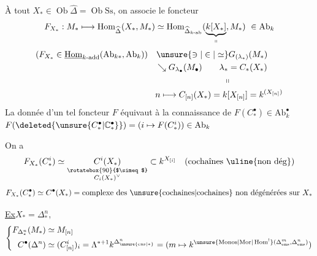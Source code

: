 À tout $X_*\in\operatorname{Ob}\widehat\Delta=\operatorname{Ob}\mathrm{Ss}$, on associe le foncteur
\[
F_{X_*}:M_*\longmapsto \operatorname{Hom}_{\widehat\Delta}(X_*,M_*)\simeq
\operatorname{Hom}_{\widehat\Delta_{k\text{-ab}}}(\underbrace{k[X_*]}_{\shortparallel},M_*)\ \in\mathrm{Ab}_k
\]
\[
\begin{aligned}
&(F_{X_*}\in\underline{\operatorname{Hom}}_{k\text{-add}}(\mathrm{Ab}_{k*},\mathrm{Ab}_k))\quad
\unsure{\ni|\in|\simeq}G_{(\lambda_*)}(M_*)\\
&\hspace{14em}\searrow G_{\lambda_\bullet}(M_\bullet)\qquad\lambda_*=C_*(X_*)\\
&\hspace{22em}\shortparallel\\
&\hspace{14em} n\longmapsto C_{[n]}(X_*)=k[X_{[n]}]=k^{(X_{[n]})}
\end{aligned}
\]
La donnée d'un tel foncteur $F$  équivaut à la connaissance de $F(C^\bullet_*)\in\mathrm{Ab}^{\bullet}_k$\qquad $F(\deleted{\unsure{C^\bullet_*|\mathbb C^\bullet_*}})=(i\mapsto F(C^i_*))\in\mathrm{Ab}_k$

On a
\[
F_{X_*}(C^i_*)\simeq \underset{\substack{\rotatebox{90}{$\simeq$}\\ C_i(X_*)^\vee}}{C^i(X_*)}\subset k^{X_{[i]}}\quad(\text{cochaînes \uline{non dég}})
\]
\[
F_{X_*}(C^\bullet_*)\simeq C^\bullet(X_*)=\text{complexe des \unsure{cochaines|cochaînes} non dégénérées sur }X_*
\]

\uline{Ex}\quad $X_*=\Delta^n_*,$
\[
\left\{\begin{aligned}
F_{\Delta^n_*}(M_*)&\simeq M_{[n]}\\
C^\bullet(\Delta^n)&\simeq(C^i_{[n]})_i=\Lambda^{*+1} k^{\Delta^n_{\unsure{\mathrm{ens}|*}}}=(m\mapsto k^{\unsure{\mathrm{Monos}|\mathrm{Mor}|\operatorname{Hom}^{!}}(\Delta^m_{\mathrm{ens}},\Delta^n_{\mathrm{ens}})})
\end{aligned}\right.
\]

